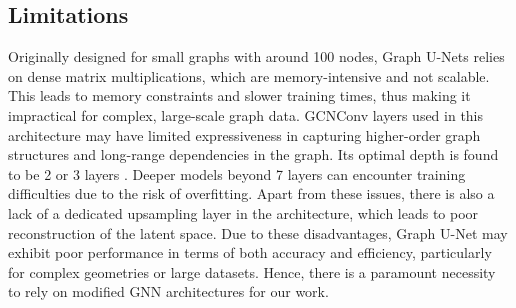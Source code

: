 \subsection{Limitations}
Originally designed for small graphs with around 100 nodes, Graph U-Nets relies on dense matrix multiplications, which are memory-intensive and not scalable. This leads to memory constraints and slower training times, thus making it impractical for complex, large-scale graph data. GCNConv layers used in this architecture may have limited expressiveness in capturing higher-order graph structures and long-range dependencies in the graph. Its optimal depth is found to be 2 or 3 layers \cite{kipf}. Deeper models beyond 7 layers can encounter training difficulties due to the risk of overfitting. Apart from these issues, there is also a lack of a dedicated upsampling layer in the architecture, which leads to poor reconstruction of the latent space. Due to these disadvantages, Graph U-Net may exhibit poor performance in terms of both accuracy and efficiency, particularly for complex geometries or large datasets. Hence, there is a paramount necessity to rely on modified GNN architectures for our work.
